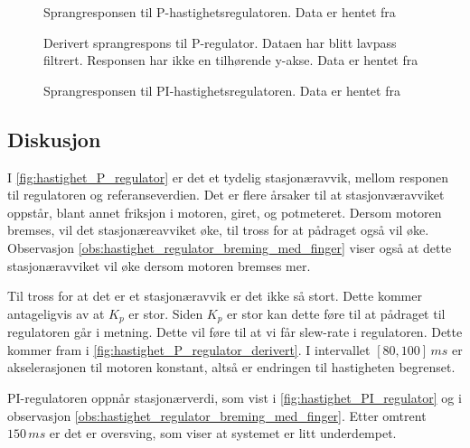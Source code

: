 \begin{figure}[h]
    \centering
    
    \caption{Sprangresponsen til P-hastighetsregulatoren. Data er hentet fra \cite{EksempelData}}
    \label{fig:hastighet_P_regulator}
\end{figure}

\begin{figure}[h]
    \centering
    
    \caption{Derivert sprangrespons til P-regulator. Dataen har blitt lavpass filtrert. Responsen har ikke en tilhørende y-akse. Data er hentet fra \cite{EksempelData}}
    \label{fig:hastighet_P_regulator_derivert}
\end{figure}

\begin{figure}[h]
    \centering
    
    \caption{Sprangresponsen til PI-hastighetsregulatoren. Data er hentet fra \cite{EksempelData}}
    \label{fig:hastighet_PI_regulator}
\end{figure}

\subsection{Diskusjon}

I \autoref{fig:hastighet_P_regulator} er det et tydelig stasjonæravvik, mellom responen til regulatoren og referanseverdien. Det er flere årsaker til at stasjonværavviket oppstår, blant annet friksjon i motoren, giret, og potmeteret. Dersom motoren bremses, vil det stasjonæreavviket øke, til tross for at pådraget også vil øke. Observasjon \ref{obs:hastighet_regulator_breming_med_finger} viser også at dette stasjonæravviket vil øke dersom motoren bremses mer.

Til tross for at det er et stasjonæravvik er det ikke så stort. Dette kommer antageligvis av at $K_p$ er stor. Siden $K_p$ er stor kan dette føre til at pådraget til regulatoren går i metning. Dette vil føre til at vi får slew-rate i regulatoren. Dette kommer fram i \autoref{fig:hastighet_P_regulator_derivert}. I intervallet $[80, 100]\,ms$ er akselerasjonen til motoren konstant, altså er endringen til hastigheten begrenset.

PI-regulatoren oppnår stasjonærverdi, som vist i \autoref{fig:hastighet_PI_regulator} og i observasjon \ref{obs:hastighet_regulator_breming_med_finger}. Etter omtrent $150\,ms$ er det er oversving, som viser at systemet er litt underdempet. 

